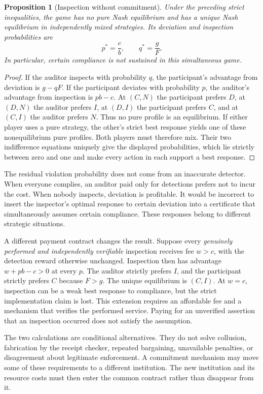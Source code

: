 \documentclass[11pt,letterpaper]{article}
\theoremstyle{plain}
\newtheorem{proposition}{Proposition}[section]
\theoremstyle{definition}
\theoremstyle{remark}
\begin{document}
\begin{proposition}[Inspection without commitment]\label{prop:strategic-inspector}
Under the preceding strict inequalities, the game has no pure Nash equilibrium and has a unique Nash equilibrium in independently mixed strategies. Its deviation and inspection probabilities are
\[
p^*=\frac{c}{b},\qquad q^*=\frac{g}{F}.
\]
In particular, certain compliance is not sustained in this simultaneous game.
\end{proposition}
\begin{proof}
If the auditor inspects with probability $q$, the participant's advantage from deviation is $g-qF$. If the participant deviates with probability $p$, the auditor's advantage from inspection is $pb-c$. At $(C,N)$ the participant prefers $D$, at $(D,N)$ the auditor prefers $I$, at $(D,I)$ the participant prefers $C$, and at $(C,I)$ the auditor prefers $N$. Thus no pure profile is an equilibrium. If either player uses a pure strategy, the other's strict best response yields one of these nonequilibrium pure profiles. Both players must therefore mix. Their two indifference equations uniquely give the displayed probabilities, which lie strictly between zero and one and make every action in each support a best response.
\end{proof}

The residual violation probability does not come from an inaccurate detector. When everyone complies, an auditor paid only for detections prefers not to incur the cost. When nobody inspects, deviation is profitable. It would be incorrect to insert the inspector's optimal response to certain deviation into a certificate that simultaneously assumes certain compliance. These responses belong to different strategic situations.

A different payment contract changes the result. Suppose every \emph{genuinely performed and independently verifiable} inspection receives fee $w>c$, with the detection reward otherwise unchanged. Inspection then has advantage $w+pb-c>0$ at every $p$. The auditor strictly prefers $I$, and the participant strictly prefers $C$ because $F>g$. The unique equilibrium is $(C,I)$. At $w=c$, inspection can be a weak best response to compliance, but the strict implementation claim is lost. This extension requires an affordable fee and a mechanism that verifies the performed service. Paying for an unverified assertion that an inspection occurred does not satisfy the assumption.

The two calculations are conditional alternatives. They do not solve collusion, fabrication by the receipt checker, repeated bargaining, unavailable penalties, or disagreement about legitimate enforcement. A commitment mechanism may move some of these requirements to a different institution. The new institution and its resource costs must then enter the common contract rather than disappear from it.
\end{document}
